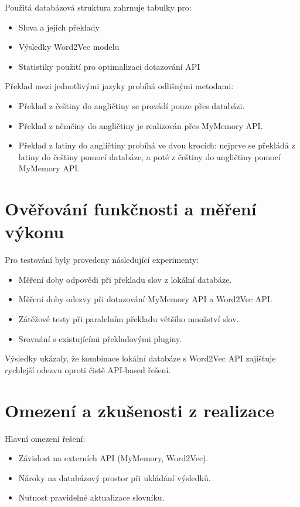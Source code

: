 \documentclass[czech, ba, kiv, he]{fasthesis}
\begin{document}
Použitá databázová struktura zahrnuje tabulky pro:

\begin{itemize}
    \item Slova a jejich překlady
    \item Výsledky Word2Vec modelu
    \item Statistiky použití pro optimalizaci dotazování API
\end{itemize}

Překlad mezi jednotlivými jazyky probíhá odlišnými metodami:
\begin{itemize}
    \item Překlad z češtiny do angličtiny se provádí pouze přes databázi.
    \item Překlad z němčiny do angličtiny je realizován přes MyMemory API.
    \item Překlad z latiny do angličtiny probíhá ve dvou krocích: nejprve se překládá z latiny do češtiny pomocí databáze, a poté z češtiny do angličtiny pomocí MyMemory API.
\end{itemize}

\section{Ověřování funkčnosti a měření výkonu}
Pro testování byly provedeny následující experimenty:

\begin{itemize}
    \item Měření doby odpovědi při překladu slov z lokální databáze.
    \item Měření doby odezvy při dotazování MyMemory API a Word2Vec API.
    \item Zátěžové testy při paralelním překladu většího množství slov.
    \item Srovnání s existujícími překladovými pluginy.
\end{itemize}

Výsledky ukázaly, že kombinace lokální databáze s Word2Vec API zajišťuje rychlejší odezvu oproti čistě API-based řešení.

\section{Omezení a zkušenosti z realizace}
Hlavní omezení řešení:

\begin{itemize}
    \item Závislost na externích API (MyMemory, Word2Vec).
    \item Nároky na databázový prostor při ukládání výsledků.
    \item Nutnost pravidelné aktualizace slovníku.
\end{itemize}
\end{document}
